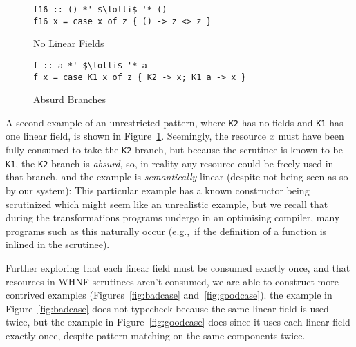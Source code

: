 \documentclass[acmsmall,review]{acmart}
\newcommand{\incode}[1]{\lstinline{#1}}
\newcommand{\lolli}{\multimap}
\begin{document}
\begin{figure}[t]
 \begin{minipage}{0.5\textwidth}
\begin{notyet}
\begin{lstlisting}
f16 :: () *' $\lolli$ '* ()
f16 x = case x of z { () -> z <> z }
\end{lstlisting}
\end{notyet}
\vspace{-0.5cm}
\caption{No Linear Fields\label{fig:nolin}}
\end{minipage}%
\begin{minipage}{0.5\textwidth}
\begin{limitation}
\begin{lstlisting}
f :: a *' $\lolli$ '* a
f x = case K1 x of z { K2 -> x; K1 a -> x }
\end{lstlisting}
\end{limitation}
\vspace{-0.5cm}
\caption{Absurd Branches\label{fig:absurd}}
\end{minipage}
\end{figure}

A second example of an unrestricted pattern, where \incode{K2} has no fields and \incode{K1}
has one linear field, is shown in Figure~\ref{fig:absurd}. Seemingly, the resource
$x$ must have been fully consumed to take the \incode{K2} branch, but because the
scrutinee is known to be \incode{K1}, the \incode{K2} branch is \emph{absurd}, so, in reality
any resource could be freely used in that branch, and the example is
\emph{semantically} linear (despite not being seen as so by our system):
%
%
%
This particular example has a known constructor being scrutinized which might
seem like an unrealistic example, but we recall that during the transformations
programs undergo in an optimising compiler, many programs such as this
naturally occur (e.g.,~if the definition of a function is inlined in the
scrutinee).
%

Further exploring that each linear field must be consumed exactly once, and
that resources in WHNF scrutinees aren't consumed, we are able to construct
more contrived examples (Figures~\ref{fig:badcase}
and~\ref{fig:goodcase}). the example in Figure~\ref{fig:badcase} does not typecheck
because the same linear field is used twice, but the example in
Figure~\ref{fig:goodcase} does since it
uses each linear field exactly once, despite pattern matching on the same
components twice.
\end{document}
